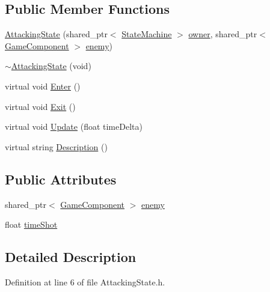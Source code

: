 \subsection*{Public Member Functions}
\begin{DoxyCompactItemize}
\item 
\hyperlink{class_b_g_e_1_1_attacking_state_abba1ed4d3c5ae9e7015bc2e2ef9f4fea}{Attacking\-State} (shared\-\_\-ptr$<$ \hyperlink{class_b_g_e_1_1_state_machine}{State\-Machine} $>$ \hyperlink{class_b_g_e_1_1_state_aa1a572a6e24067716eab1f110381bee8}{owner}, shared\-\_\-ptr$<$ \hyperlink{class_b_g_e_1_1_game_component}{Game\-Component} $>$ \hyperlink{class_b_g_e_1_1_attacking_state_aa6055274f8431a6f2bfeae8e7b47f46f}{enemy})
\item 
\hyperlink{class_b_g_e_1_1_attacking_state_aa086280976088c856cf7bcb212ee2aea}{$\sim$\-Attacking\-State} (void)
\item 
virtual void \hyperlink{class_b_g_e_1_1_attacking_state_a644f616bb9949c869efc77ce18523449}{Enter} ()
\item 
virtual void \hyperlink{class_b_g_e_1_1_attacking_state_aa2c7fa13ad9e88a390372e293bfff330}{Exit} ()
\item 
virtual void \hyperlink{class_b_g_e_1_1_attacking_state_a554f1e612938daae811a7caa146e117c}{Update} (float time\-Delta)
\item 
virtual string \hyperlink{class_b_g_e_1_1_attacking_state_a81c2b6ed9f85dc4b99e22c57989fcc6c}{Description} ()
\end{DoxyCompactItemize}
\subsection*{Public Attributes}
\begin{DoxyCompactItemize}
\item 
shared\-\_\-ptr$<$ \hyperlink{class_b_g_e_1_1_game_component}{Game\-Component} $>$ \hyperlink{class_b_g_e_1_1_attacking_state_aa6055274f8431a6f2bfeae8e7b47f46f}{enemy}
\item 
float \hyperlink{class_b_g_e_1_1_attacking_state_ab886e975d65afe0bcfdfe2a50d7d6d6d}{time\-Shot}
\end{DoxyCompactItemize}


\subsection{Detailed Description}


Definition at line 6 of file Attacking\-State.\-h.



